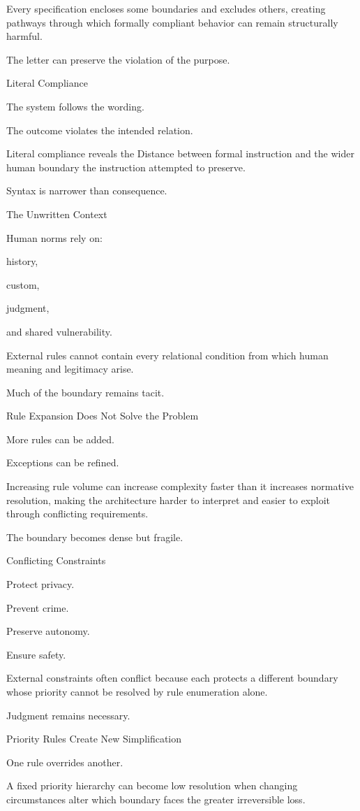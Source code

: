 Every specification encloses some boundaries and excludes others, creating pathways through which formally compliant behavior can remain structurally harmful.

The letter can preserve the violation of the purpose.

Literal Compliance

The system follows the wording.

The outcome violates the intended relation.

Literal compliance reveals the Distance between formal instruction and the wider human boundary the instruction attempted to preserve.

Syntax is narrower than consequence.

The Unwritten Context

Human norms rely on:

history,

custom,

judgment,

and shared vulnerability.

External rules cannot contain every relational condition from which human meaning and legitimacy arise.

Much of the boundary remains tacit.

Rule Expansion Does Not Solve the Problem

More rules can be added.

Exceptions can be refined.

Increasing rule volume can increase complexity faster than it increases normative resolution, making the architecture harder to interpret and easier to exploit through conflicting requirements.

The boundary becomes dense but fragile.

Conflicting Constraints

Protect privacy.

Prevent crime.

Preserve autonomy.

Ensure safety.

External constraints often conflict because each protects a different boundary whose priority cannot be resolved by rule enumeration alone.

Judgment remains necessary.

Priority Rules Create New Simplification

One rule overrides another.

A fixed priority hierarchy can become low resolution when changing circumstances alter which boundary faces the greater irreversible loss.

